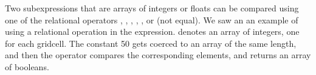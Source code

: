 Two subexpressions that are arrays of integers or floats can be compared
using one of the relational operators \code{<}, \code{<=}, \code{==},
\code{>=}, \code{>}, or \code{!=} (not equal).  We saw an an example of
using a relational operation in the 
expression.   denotes an array of
integers, one for each gridcell.  The constant 50 gets coerced to an array
of the same length, and then the \code{>} operator compares the
corresponding elements, and returns an array of booleans.
